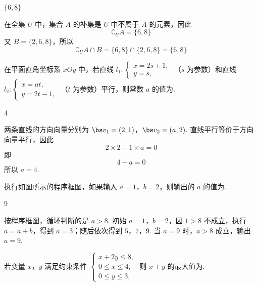 \begin{answer}
\(\{6,8\}\)
\end{answer}

\begin{solution}
在全集 \(U\) 中，集合 \(A\) 的补集是 \(U\) 中不属于 \(A\) 的元素，因此
\[
\complement_U A=\{6,8\}
\]
又 \(B=\{2,6,8\}\)，所以
\[
\complement_U A\cap B=\{6,8\}\cap\{2,6,8\}=\{6,8\}
\]
\end{solution}

\begin{problem}
在平面直角坐标系 \(xOy\) 中，若直线 \(l_{1}: \begin{cases}
x = 2s + 1,\\
y = s,
\end{cases}\) （\(s\) 为参数）和直线 \(l_{2}: \begin{cases}
x = at,\\
y = 2t - 1,
\end{cases}\) （\(t\) 为参数）平行，则常数 \(a\) 的值为\fillinblank{}.
\end{problem}

\begin{answer}
4
\end{answer}

\begin{solution}
两条直线的方向向量分别为
\(\bs v_1=(2,1)\)，\(\bs v_2=(a,2)\).
直线平行等价于方向向量平行，因此
\[
2\times2-1\times a=0
\]
即
\[
4-a=0
\]
所以 \(a=4\).
\end{solution}

\begin{problem}
执行如图所示的程序框图，如果输入 \(a = 1\)，\(b = 2\)，则输出的 \(a\) 的值为\fillinblank{}.

\end{problem}

\begin{answer}
9
\end{answer}

\begin{solution}
按程序框图，循环判断的是 \(a>8\). 初始 \(a=1\)，\(b=2\)，因 \(1>8\) 不成立，执行 \(a=a+b\)，得到 \(a=3\)；随后依次得到
\(5\)，\(7\)，\(9\).
当 \(a=9\) 时，\(a>8\) 成立，输出 \(a=9\).
\end{solution}

\begin{problem}
若变量 \(x\)，\(y\) 满足约束条件 \(\begin{cases}
x + 2y \leqslant 8,\\
0 \leqslant x \leqslant 4,\\
0 \leqslant y \leqslant 3,
\end{cases}\) 则 \(x + y\) 的最大值为\fillinblank{}.
\end{problem}

